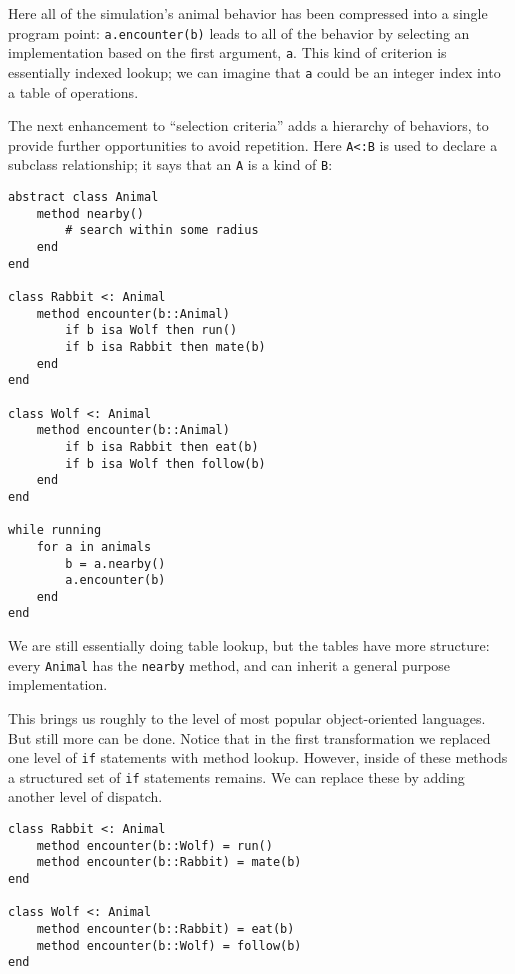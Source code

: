 Here all of the simulation's animal behavior has been
compressed into a single program point: \texttt{a.encounter(b)}
leads to all of the behavior by selecting an implementation based
on the first argument, \texttt{a}.
This kind of criterion is essentially indexed lookup; we can imagine
that \texttt{a} could be an integer index into a table of operations.

The next enhancement to ``selection criteria'' adds a hierarchy
of behaviors, to provide further opportunities to avoid repetition.
Here \texttt{A<:B} is used to declare a subclass relationship; it
says that an \texttt{A} is a kind of \texttt{B}:

\vspace{-3ex}
\begin{singlespace}
\begin{multicols}{2}
\begin{verbatim}
abstract class Animal
    method nearby()
        # search within some radius
    end
end

class Rabbit <: Animal
    method encounter(b::Animal)
        if b isa Wolf then run()
        if b isa Rabbit then mate(b)
    end
end

class Wolf <: Animal
    method encounter(b::Animal)
        if b isa Rabbit then eat(b)
        if b isa Wolf then follow(b)
    end
end

while running
    for a in animals
        b = a.nearby()
        a.encounter(b)
    end
end
\end{verbatim}
\end{multicols}
\end{singlespace}

We are still essentially doing table lookup, but the tables have
more structure: every \texttt{Animal} has the \texttt{nearby}
method, and can inherit a general purpose implementation.

This brings us roughly to the level of most popular object-oriented
languages.
But still more can be done.
Notice that in the first transformation we replaced one level of \texttt{if}
statements with method lookup.
However, inside of these methods a structured set of \texttt{if} statements
remains.
We can replace these by adding another level of dispatch.

\vspace{-3ex}
\begin{singlespace}
\begin{verbatim}
class Rabbit <: Animal
    method encounter(b::Wolf) = run()
    method encounter(b::Rabbit) = mate(b)
end

class Wolf <: Animal
    method encounter(b::Rabbit) = eat(b)
    method encounter(b::Wolf) = follow(b)
end
\end{verbatim}
\end{singlespace}

